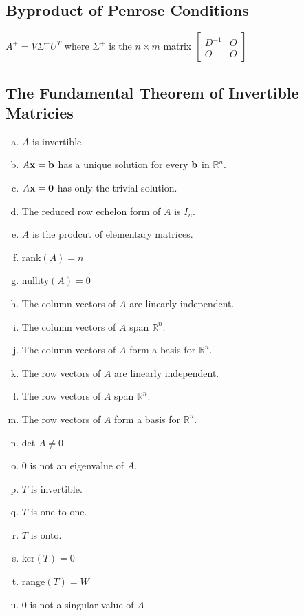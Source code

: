 \subsection*{Byproduct of Penrose Conditions}
$A^+=V\Sigma^+U^T$ where $\Sigma^+$ is the $n\times m$ matrix $\begin{bmatrix}
        D^{-1} & O \\
        O      & O
    \end{bmatrix}$

\subsection*{The Fundamental Theorem of Invertible Matricies}
\begin{enumerate}[(a)]
    \item $A$ is invertible.
    \item $A\mathbf{x}=\mathbf{b}$ has a unique solution for every $\mathbf{b}$ in $\mathbb{R}^n$.
    \item $A\mathbf{x}=\mathbf{0}$ has only the trivial solution.
    \item The reduced row echelon form of $A$ is $I_n$.
    \item $A$ is the prodcut of elementary matrices.
    \item rank$(A)=n$
    \item nullity$(A)=0$
    \item The column vectors of $A$ are linearly independent.
    \item The column vectors of $A$ span $\mathbb{R}^n$.
    \item The column vectors of $A$ form a basis for $\mathbb{R}^n$.
    \item The row vectors of $A$ are linearly independent.
    \item The row vectors of $A$ span $\mathbb{R}^n$.
    \item The row vectors of $A$ form a basis for $\mathbb{R}^n$.
    \item det $A\neq0$
    \item 0 is not an eigenvalue of $A$.
    \item $T$ is invertible.
    \item $T$ is one-to-one.
    \item $T$ is onto.
    \item ker$(T)=0$
    \item range$(T)=W$
    \item 0 is not a singular value of $A$
\end{enumerate}

